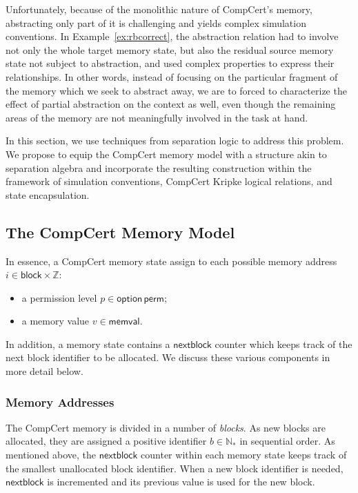 \documentclass[acmsmall,screen,review,anonymous]{acmart}
\newcommand{\kw}[1]{\ensuremath{ \mathsf{#1} }}
\begin{document}
Unfortunately,
because of the monolithic nature of CompCert's memory,
abstracting only part of it is challenging
and yields complex simulation conventions.
In Example~\ref{ex:rbcorrect},
the abstraction relation had to involve
not only the whole target memory state,
but also the residual source memory state
not subject to abstraction,
and used complex properties to express their relationships.
In other words,
instead of focusing on the particular fragment of the memory
which we seek to abstract away,
we are to forced to characterize the effect of partial abstraction
on the context as well,
even though the remaining areas of the memory
are not meaningfully involved in the task at hand.

In this section,
we use techniques from separation logic
to address this problem.
We propose to equip the CompCert memory model
with a structure akin to separation algebra \cite{something-for-sa}
and incorporate the resulting construction
within the framework of simulation conventions,
CompCert Kripke logical relations,
and state encapsulation.

\subsection{The CompCert Memory Model}

In essence,
a CompCert memory state
assign to each possible memory address $i \in \kw{block} \times \mathbb{Z}$:
\begin{itemize}
  \item a permission level $p \in \kw{option}\,\kw{perm}$;
  \item a memory value $v \in \kw{memval}$.
\end{itemize}
In addition,
a memory state contains a $\kw{nextblock}$ counter
which keeps track of the next block identifier to be allocated.
We discuss these various components in more detail below.

\subsubsection{Memory Addresses}

The CompCert memory is divided in a number of \emph{blocks}.
As new blocks are allocated,
they are assigned a positive identifier $b \in \mathbb{N}_*$
in sequential order.
As mentioned above,
the $\kw{nextblock}$ counter within each memory state
keeps track of the smallest unallocated block identifier.
When a new block identifier is needed,
$\kw{nextblock}$ is incremented and its previous value
is used for the new block.
\end{document}
